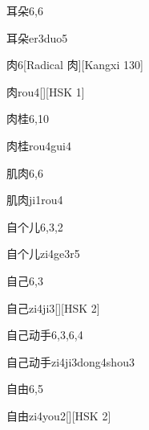 \begin{entry}{耳朵}{6,6}
  \begin{phonetics}{耳朵}{er3duo5}
  \end{phonetics}
\end{entry}

\begin{entry}{肉}{6}[Radical 肉][Kangxi 130]
  \begin{phonetics}{肉}{rou4}[][HSK 1]
  \end{phonetics}
\end{entry}

\begin{entry}{肉桂}{6,10}
  \begin{phonetics}{肉桂}{rou4gui4}
  \end{phonetics}
\end{entry}

\begin{entry}{肌肉}{6,6}
  \begin{phonetics}{肌肉}{ji1rou4}
  \end{phonetics}
\end{entry}

\begin{entry}{自个儿}{6,3,2}
  \begin{phonetics}{自个儿}{zi4ge3r5}
  \end{phonetics}
\end{entry}

\begin{entry}{自己}{6,3}
  \begin{phonetics}{自己}{zi4ji3}[][HSK 2]
  \end{phonetics}
\end{entry}

\begin{entry}{自己动手}{6,3,6,4}
  \begin{phonetics}{自己动手}{zi4ji3dong4shou3}
  \end{phonetics}
\end{entry}

\begin{entry}{自由}{6,5}
  \begin{phonetics}{自由}{zi4you2}[][HSK 2]
  \end{phonetics}
\end{entry}

